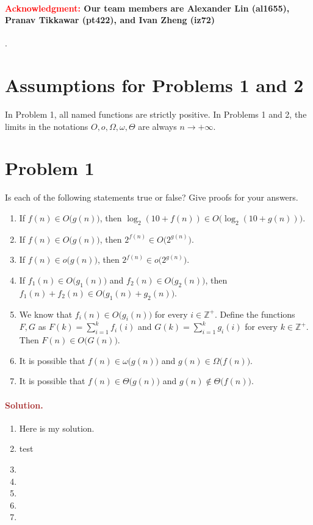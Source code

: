 \paragraph{\textcolor{red}{Acknowledgment:} Our team members are \textbf{Alexander Lin (al1655)}, \textbf{Pranav Tikkawar (pt422)}, and \textbf{Ivan Zheng (iz72)}}.

\section*{Assumptions for Problems 1 and 2}
In Problem 1, all named functions are strictly positive. In Problems 1 and 2, the limits in the notations $O, o, \Omega, \omega, \Theta$ are always $n \to +\infty$.

\section*{Problem 1}
Is each of the following statements true or false? Give proofs for your answers.
\begin{enumerate}
    \item If $f(n) \in O\big(g(n)\big)$, then $\log_2 (10 + f(n)) \in O\big(\log_2 (10 + g(n))\big)$.
    \item If $f(n) \in O\big(g(n)\big)$, then $2^{f(n)} \in O\big(2^{g(n)}\big)$.
    \item If $f(n) \in o\big(g(n)\big)$, then $2^{f(n)} \in o\big(2^{g(n)}\big)$.
    \item If $f_1(n) \in O\big(g_1(n)\big)$ and $f_2(n) \in O\big(g_2(n)\big)$, then $f_1(n) + f_2(n) \in O\big(g_1(n) + g_2(n)\big)$.
    \item We know that $f_i(n) \in O\big(g_i(n)\big)$ for every $i \in \mathbb{Z}^+$. Define the functions $F, G$ as $F(k) = \sum_{i = 1}^k f_i(i)$ and $G(k) = \sum_{i = 1}^k g_i(i)$ for every $k \in \mathbb{Z}^+$. Then $F(n) \in O\big(G(n)\big)$.
    \item It is possible that $f(n) \in \omega\big(g(n)\big)$ and $g(n) \in \Omega\big(f(n)\big)$.
    \item It is possible that $f(n) \in \Theta\big(g(n)\big)$ and $g(n) \notin \Theta\big(f(n)\big)$.
\end{enumerate}

\paragraph{\textcolor{brown}{Solution.}}
\begin{enumerate}
    \item Here is my solution.
    \item test
    \item 
    \item 
    \item
    \item 
    \item 
\end{enumerate}

